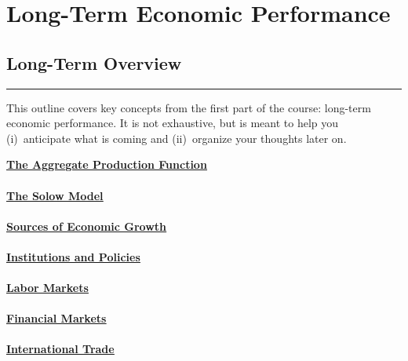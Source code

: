 \part{Long-Term Economic Performance}

\chapter*{Long-Term Overview}
\hypertarget{lrp}{}

\rule{\textwidth}{1pt}

This outline covers key concepts from the first part of the course: long-term economic performance. It is not exhaustive, but is meant to help you
(i)~anticipate what is coming and (ii)~organize your thoughts later on.

\medskip
\hyperref[chp:agpf]{\textbf{\underline{The Aggregate Production Function}}}\\ \\
    

\hyperref[chp:solo]{\textbf{\underline{The Solow Model}}}\\ \\
    

\textbf{\hyperref[chp:grth]{\underline{Sources of Economic Growth}}}\\ \\
    

\textbf{\hyperref[chp:insp]{\underline{Institutions and Policies}}}\\ \\
    

\hyperref[chp:lbmk]{\textbf{\underline{Labor Markets}}}\\ \\
    

\hyperref[chp:fnmk]{\textbf{\underline{Financial Markets}}}\\ \\
    

\hyperref[chp:intr]{\textbf{\underline{International Trade}}}\\ \\
    
